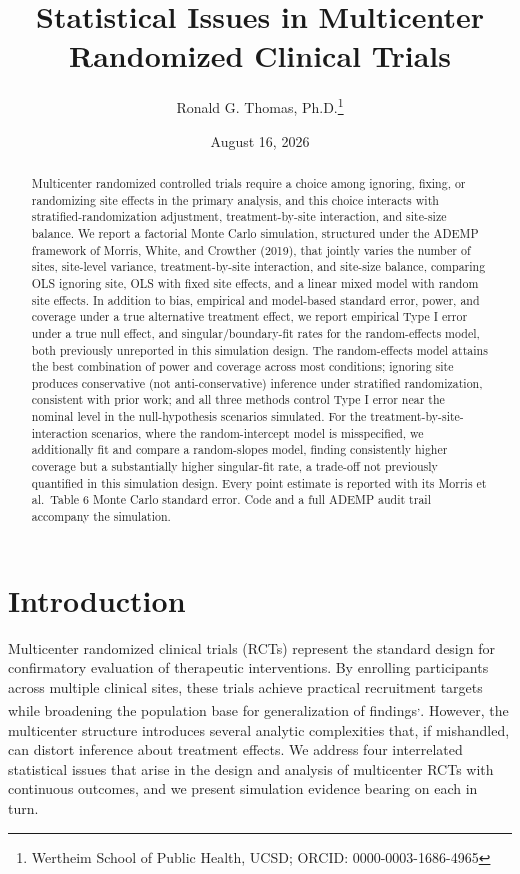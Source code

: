 \documentclass[
  11pt,
]{article}
\title{Statistical Issues in Multicenter Randomized Clinical Trials}
\author{Ronald G. Thomas, Ph.D.\thanks{Wertheim School of Public Health, UCSD; ORCID: 0000-0003-1686-4965}}
\date{August 16, 2026}
\begin{document}
\maketitle
\begin{abstract}
Multicenter randomized controlled trials require a choice among
ignoring, fixing, or randomizing site effects in the primary
analysis, and this choice interacts with stratified-randomization
adjustment, treatment-by-site interaction, and site-size balance.
We report a factorial Monte Carlo simulation, structured under the
ADEMP framework of Morris, White, and Crowther (2019), that jointly
varies the number of sites, site-level variance, treatment-by-site
interaction, and site-size balance, comparing OLS ignoring site,
OLS with fixed site effects, and a linear mixed model with random
site effects. In addition to bias, empirical and model-based
standard error, power, and coverage under a true alternative
treatment effect, we report empirical Type I error under a true
null effect, and singular/boundary-fit rates for the random-effects
model, both previously unreported in this simulation design. The
random-effects model attains the best combination of power and
coverage across most conditions; ignoring site produces conservative
(not anti-conservative) inference under stratified randomization,
consistent with prior work; and all three methods control Type I
error near the nominal level in the null-hypothesis scenarios
simulated. For the treatment-by-site-interaction scenarios, where
the random-intercept model is misspecified, we additionally fit and
compare a random-slopes model, finding consistently higher coverage
but a substantially higher singular-fit rate, a trade-off not
previously quantified in this simulation design. Every point
estimate is
reported with its Morris et al.~Table 6 Monte Carlo standard error.
Code and a full ADEMP audit trail accompany the simulation.
\end{abstract}

{
\setcounter{tocdepth}{2}
\tableofcontents
}
\section{Introduction}\label{introduction}

Multicenter randomized clinical trials (RCTs) represent the
standard design for confirmatory evaluation of therapeutic
interventions. By enrolling participants across multiple
clinical sites, these trials achieve practical recruitment
targets while broadening the population base for
generalization of findings\textsuperscript{,}.
However, the multicenter structure introduces several analytic
complexities that, if mishandled, can distort inference about
treatment effects. We address four interrelated statistical
issues that arise in the design and analysis of multicenter
RCTs with continuous outcomes, and we present simulation
evidence bearing on each in turn.
\end{document}
